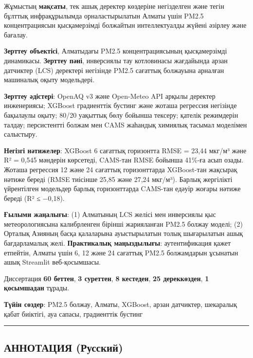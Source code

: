Жұмыстың \textbf{мақсаты}, тек ашық деректер көздеріне негізделген және тегін бұлттық инфрақұрылымда орналастырылатын Алматы үшін PM2.5 концентрациясын қысқамерзімді болжайтын интеллектуалды жүйені әзірлеу және бағалау.

\textbf{Зерттеу объектісі}, Алматыдағы PM2.5 концентрациясының қысқамерзімді динамикасы. \textbf{Зерттеу пәні}, инверсиялы тау котловинасы жағдайында арзан датчиктер (LCS) деректері негізінде PM2.5 сағаттық болжауына арналған машиналық оқыту модельдері.

\textbf{Зерттеу әдістері}: OpenAQ v3 және Open-Meteo API арқылы деректер инженериясы; XGBoost градиенттік бустинг және жоташа регрессия негізінде бақылаулы оқыту; 80/20 уақыттық бөлу бойынша тексеру; қателік режимдерін талдау; персистентті болжам мен CAMS жаһандық химиялық тасымал моделімен салыстыру.

\textbf{Негізгі нәтижелер}: XGBoost 6 сағаттық горизонтта RMSE = 23,44 мкг/м³ және R² = 0,545 мәндерін көрсетеді, CAMS-тан RMSE бойынша 41\%-ға асып озады. Жоташа регрессия 12 және 24 сағаттық горизонттарда XGBoost-тан жақсырақ нәтиже береді (RMSE тиісінше 25,85 және 27,24 мкг/м³). Барлық жергілікті үйрентілген модельдер барлық горизонттарда CAMS-тан едәуір жоғары нәтиже береді (R² ≤ −0,18).

\textbf{Ғылыми жаңалығы}: (1) Алматының LCS желісі мен инверсиялы қыс метеорологиясына калибрленген бірінші жарияланған PM2.5 болжау моделі; (2) Орталық Азияның басқа қалаларына ауыстырылатын толық шығарылатын ашық бағдарламалық желі. \textbf{Практикалық маңыздылығы}: аутентификация қажет етпейтін, Алматы үшін 6, 12 және 24 сағаттық PM2.5 болжамдарын ұсынатын ашық Streamlit веб-қосымшасы.

Диссертация \textbf{60 беттен}, \textbf{3 суреттен}, \textbf{8 кестеден}, \textbf{25 дереккөзден}, \textbf{1 қосымшадан} тұрады.

\textbf{Түйін сөздер}: PM2.5 болжау, Алматы, XGBoost, арзан датчиктер, шекаралық қабат биіктігі, ауа сапасы, градиенттік бустинг

\begin{center}\rule{0.5\linewidth}{0.5pt}\end{center}

\subsection{АННОТАЦИЯ (Русский)}\label{ux430ux43dux43dux43eux442ux430ux446ux438ux44f-ux440ux443ux441ux441ux43aux438ux439}

